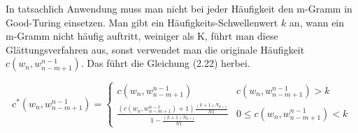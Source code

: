 In tatsachlich Anwendung muss man nicht bei jeder H\"aufigkeit den m-Gramm in Good-Turing einsetzen. Man gibt ein H\"aufigkeits-Schwellenwert $k$ an, wann ein m-Gramm nicht h\"aufig auftritt, weiniger als K, f\"uhrt man diese Gl\"attungsverfahren aus, sonst verwendet man die originale H\"aufigkeit $c(w_{n},w_{n-m+1}^{n-1})$. Das f\"uhrt die Gleichung (2.22) herbei.

\begin{equation}
\label{equationo:witten_bell_04}
c^{*}(w_{n},w_{n-m+1}^{n-1})=\begin{cases}
c(w_{n},w_{n-m+1}^{n-1}) & c(w_{n},w_{n-m+1}^{n-1})>k \\
\frac{(c(w_{n},w_{n-m+1}^{n-1})+1)\frac{(k+1)N_{k+1}}{N{1}}}{1-\frac{(k+1)N_{k+1}}{N{1}}} & 0 \leq c(w_{n},w_{n-m+1}^{n-1})<k 
\end{cases}
\end{equation}